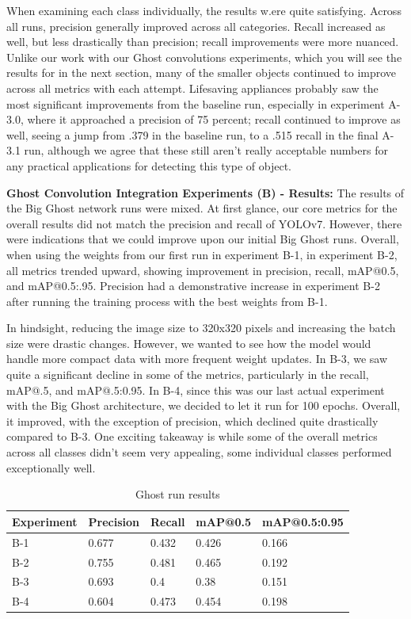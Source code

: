 \documentclass[sigplan,nonacm]{acmart}
\begin{document}
When examining each class individually, the results w.ere quite satisfying. Across all runs, precision generally improved across all categories. Recall increased as well, but less drastically than precision; recall improvements were more nuanced. Unlike our work with our Ghost convolutions experiments, which you will see the results for in the next section, many of the smaller objects continued to improve across all metrics with each attempt. Lifesaving appliances probably saw the most significant improvements from the baseline run, especially in experiment A-3.0, where it approached a precision of 75 percent; recall continued to improve as well, seeing a jump from .379 in the baseline run, to a .515 recall in the final A-3.1 run, although we agree that these still aren't really acceptable numbers for any practical applications for detecting this type of object. 

\textbf{Ghost Convolution Integration Experiments (B) - Results:}
The results of the Big Ghost network runs were mixed. At first glance, our core metrics for the overall results did not match the precision and recall of YOLOv7. However, there were indications that we could improve upon our initial Big Ghost runs. Overall, when using the weights from our first run in experiment B-1, in experiment B-2, all metrics trended upward, showing improvement in precision, recall, mAP@0.5, and mAP@0.5:.95. Precision had a demonstrative increase in experiment B-2 after running the training process with the best weights from B-1. 

In hindsight, reducing the image size to 320x320 pixels and increasing the batch size were drastic changes. However, we wanted to see how the model would handle more compact data with more frequent weight updates. In B-3, we saw quite a significant decline in some of the metrics, particularly in the recall, mAP@.5, and mAP@.5:0.95. In B-4, since this was our last actual experiment with the Big Ghost architecture, we decided to let it run for 100 epochs. Overall, it improved, with the exception of precision, which declined quite drastically compared to B-3. One exciting takeaway is while some of the overall metrics across all classes didn't seem very appealing, some individual classes performed exceptionally well. 
\nopagebreak
\begin{table}[h!]
\centering
\begin{tabular}{|l |l |l |l |l|} \hline  
Experiment & Precision & Recall & mAP@0.5 & mAP@0.5:0.95 \\ \hline 
B-1 & 0.677 & 0.432 & 0.426 & 0.166 \\ \hline 
B-2 & 0.755 & 0.481 & 0.465 & 0.192 \\ \hline 
B-3 & 0.693 & 0.4 & 0.38 & 0.151 \\ \hline 
B-4 & 0.604 & 0.473 & 0.454 & 0.198 \\ \hline
\end{tabular}
\caption{Ghost run results}
\label{tab:GhostB}
\end{table}
\end{document}
